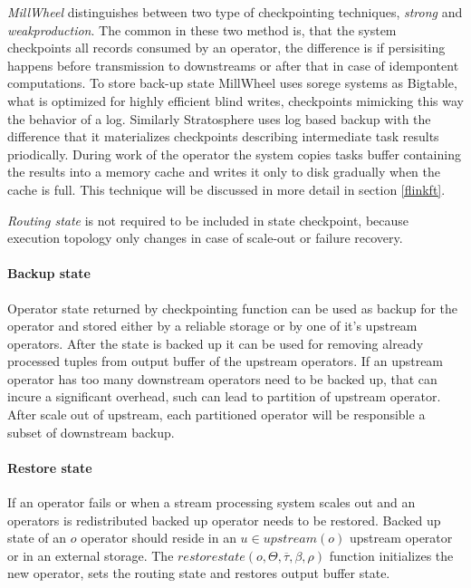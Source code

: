 \textit{MillWheel} %
distinguishes between two type of checkpointing techniques, \textit{strong} and \textit{weakproduction}. The common in these two method is, that the system checkpoints all records consumed by an operator, the difference is if persisiting happens before transmission to downstreams or after that in case of idempontent computations. To store back-up state MillWheel uses sorege systems as Bigtable\cite{bigtable}, what is optimized for highly efficient blind writes, checkpoints mimicking this way the behavior of a log.
Similarly Stratosphere uses log based backup with the difference that it  materializes checkpoints describing intermediate task results priodically. During work of the operator the system copies tasks buffer containing the results into a memory cache and writes it only to disk gradually when the cache is full. This technique will be discussed in more detail in section \ref{flinkft}. 

\textit{Routing state} is not required to be included in state checkpoint, because execution topology only changes in case of scale-out or failure recovery.

\paragraph{Backup state}
Operator state returned by checkpointing function can be used as backup for the operator and stored either by a reliable storage or by one of it's upstream operators. After the state is backed up it can be used for removing already processed tuples from output buffer of the upstream operators. If an upstream operator has too many downstream operators need to be backed up, that can incure a significant overhead, such can lead to partition of upstream operator. After scale out of upstream, each partitioned operator will be responsible a subset of downstream backup. 


\paragraph{Restore state}
If an operator fails or when a stream processing system scales out and an operators is redistributed backed up operator needs to be restored. Backed up state of an $o$ operator should reside in an $u \in upstream(o)$ upstream operator or in an external storage.  The $restorestate(o,\Theta,\overline{\tau},\beta,\rho)$ function initializes the new operator, sets the routing state and restores output buffer state.

